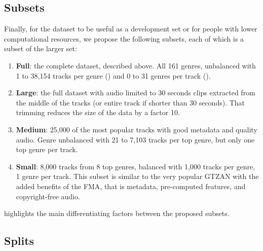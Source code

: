 \documentclass{article}
\newcommand{\ngenres}{161 }
\begin{document}
\subsection{Subsets} \label{sec:subsets}

Finally, for the dataset to be useful as a development set or for people with lower computational resources, we propose the following subsets, each of which is a subset of the larger set:
\begin{enumerate}
	\item \textbf{Full}: the complete dataset, described above. All \ngenres genres, unbalanced with 1 to 38,154 tracks per genre () and 0 to 31 genres per track ().
	\item \textbf{Large}: the full dataset with audio limited to 30 seconds clips extracted from the middle of the tracks (or entire track if shorter than 30 seconds). That trimming reduces the size of the data by a factor 10.
	\item \textbf{Medium}: 25,000 of the most popular tracks with good metadata and quality audio. Genre unbalanced with 21 to 7,103 tracks per top genre, but only one top genre per track.
	\item \textbf{Small}: 8,000 tracks from 8 top genres, balanced with 1,000 tracks per genre, 1 genre per track. This subset is similar to the very popular GTZAN \cite{gtzan} with the added benefits of the FMA, that is metadata, pre-computed features, and copyright-free audio.
\end{enumerate}
 highlights the main differentiating factors between the proposed subsets.

\subsection{Splits}
\end{document}
